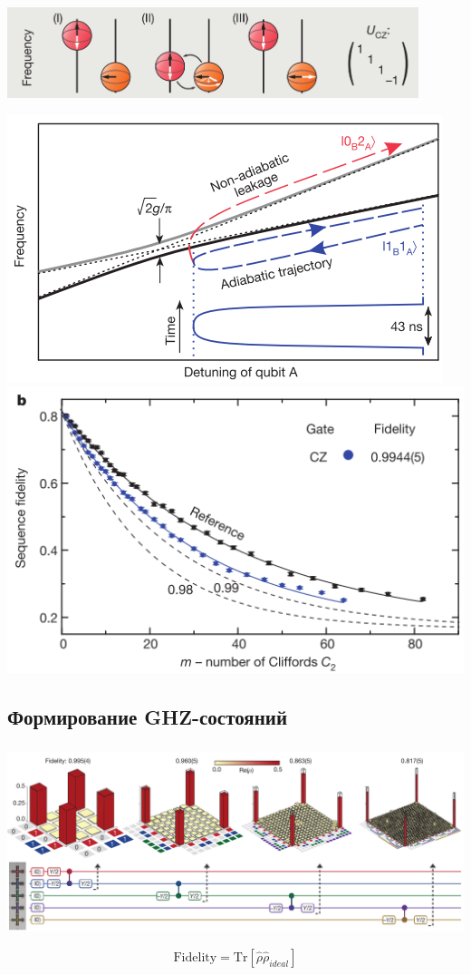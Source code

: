 \documentclass[aspectratio=169, 13pt, t]{beamer}
\begin{document}
\begin{frame}[t]\frametitle{\secname}\framesubtitle{\subsecname}
\centering
\includegraphics[width=0.9\textwidth]{cz}

\includegraphics[height=0.48\textheight]{detune}
\includegraphics[height=0.5\textheight]{czrb}
\end{frame}

\subsection{Формирование GHZ-состояний}
\begin{frame}[t]\frametitle{\secname}\framesubtitle{\subsecname}
\includegraphics[width=\textwidth]{ghz}

\[
\text{Fidelity} = \text{Tr}[\hat\rho\hat\rho_{ideal}]
\]
\end{frame}
\end{document}
